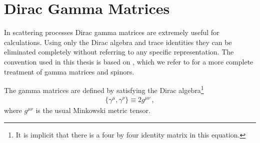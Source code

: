 \section{Dirac Gamma Matrices}\label{sec:Appendix Dirac gamma matrices}
In scattering processes Dirac gamma matrices are extremely useful for calculations. Using only the Dirac algebra and trace identities they can be eliminated completely without referring to any specific representation. The convention used in this thesis is based on \cite{pal2007representationindependent}, which we refer to for a more complete treatment of gamma matrices and spinors.

The gamma matrices are defined by satisfying the Dirac algebra\footnote{It is implicit that there is a four by four identity matrix in this equation.}
\begin{align}\label{eq:Dirac algebra}
    \{\gamma^{\mu},\gamma^{\nu}\}\equiv 2g^{\mu\nu}\,,
\end{align}
where $g^{\mu\nu}$ is the usual Minkowski metric tensor.

